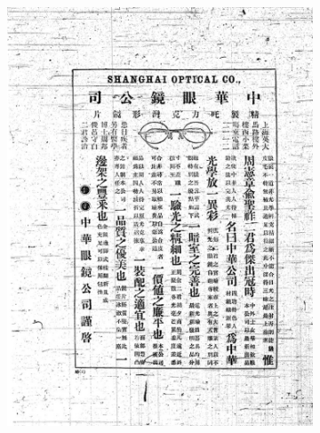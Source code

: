\documentclass{beamer}
\begin{document}
\begin{frame}
\begin{figure}[htbp]
        \hfill
        \begin{subfigure}[b]{0.23\linewidth}
            \includegraphics[height=1.3\linewidth]{./figures/fnzz1}
        \end{subfigure}
        \hfill
        \begin{subfigure}[b]{0.23\linewidth}

\end{subfigure}
\end{figure}
\end{frame}
\end{document}
